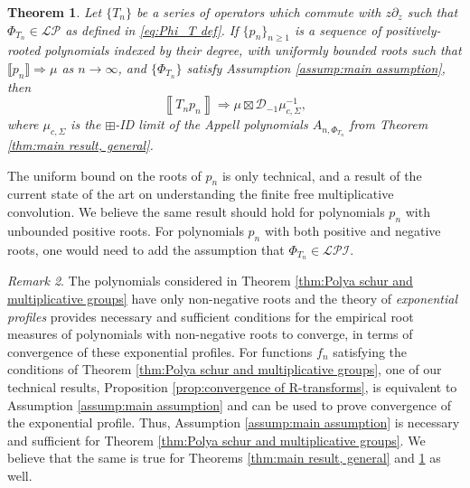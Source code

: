 \documentclass[reqno]{amsart}
\newcommand{\1}{\mathbf{1}}
\theoremstyle{plain}
\newtheorem{theorem}{Theorem}[section]
\theoremstyle{definition}
\theoremstyle{remark}
\newtheorem{remark}[theorem]{Remark}
\numberwithin{equation}{section}
\begin{document}
\begin{theorem}\label{thm:Polya-Schur full version}
	Let $\{T_{n}\}$ be a series of operators which commute with $z\partial_z$  such that $\Phi_{T_n}\in\mathcal{LP}$ as defined in \eqref{eq:Phi_T def}. If $\{p_n\}_{n\geq 1}$ is a sequence of positively-rooted polynomials indexed by their degree, with uniformly bounded roots such that $\llbracket p_n\rrbracket\Rightarrow\mu$ as $n\rightarrow\infty$, and $\{\Phi_{T_n}\}$ satisfy Assumption \ref{assump:main assumption}, then \begin{equation}
		\left\llbracket T_{n}p_n \right\rrbracket\Rightarrow \mu\boxtimes \mathcal{D}_{-1}\mu_{c,\Sigma}^{-1},
	\end{equation} where $\mu_{c,\Sigma}$ is the $\boxplus$-ID limit of the Appell polynomials $A_{n,\Phi_{T_n}}$ from Theorem \ref{thm:main result, general}.
\end{theorem} The uniform bound on the roots of $p_n$ is only technical, and a result of the current state of the art on understanding the finite free multiplicative convolution. We believe the same result should hold for polynomials $p_n$ with unbounded positive roots. For polynomials $p_n$ with both positive and negative roots, one would need to add the assumption that $\Phi_{T_n}\in\mathcal{LPI}$. 

\begin{remark}\label{rem:optimality}
 The polynomials considered in Theorem \ref{thm:Polya schur and multiplicative groups} have only non-negative roots and the theory of \emph{exponential profiles} \cite[Theorems 2.2 and 2.4]{Jalowy-Kabluchko-Marynych2025} provides necessary and sufficient conditions for the empirical root measures of polynomials with non-negative roots to converge, in terms of convergence of these exponential profiles. For functions $f_n$ satisfying the conditions of Theorem \ref{thm:Polya schur and multiplicative groups}, one of our technical results, Proposition \ref{prop:convergence of R-transforms}, is equivalent to Assumption \ref{assump:main assumption} and can be used to prove convergence of the exponential profile. Thus, Assumption \ref{assump:main assumption} is necessary and sufficient for Theorem \ref{thm:Polya schur and multiplicative groups}. We believe that the same is true for Theorems \ref{thm:main result, general} and \ref{thm:Polya-Schur full version} as well.%
\end{remark}
\end{document}
